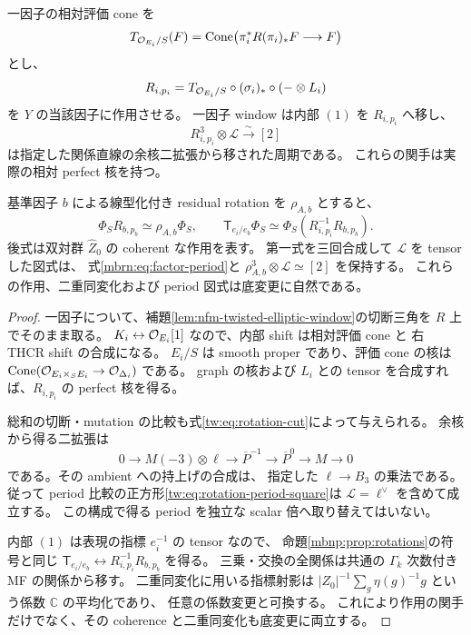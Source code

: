 \begin{proposition}
\label{mbrn:prop:rotations}
一因子の相対評価 cone を
\[
 T_{\mathcal O_{E_i}/S}(F)=
 \operatorname{Cone}\bigl(\pi_i^*R(\pi_i)_*F\longrightarrow F\bigr)
\]
とし、
\[
 R_{i,p_i}=T_{\mathcal O_{E_i}/S}\circ(\sigma_i)_*\circ(-\otimes L_i)
\]
を $Y$ の当該因子に作用させる。
一因子 window は内部 $(1)$ を $R_{i,p_i}$ へ移し、
\begin{equation}\label{mbrn:eq:factor-period}
 R_{i,p_i}^3\otimes\mathscr L\xrightarrow{\sim}[2]
\end{equation}
は指定した関係直線の余核二拡張から移された周期である。
これらの関手は実際の相対 perfect 核を持つ。

基準因子 $b$ による線型化付き residual rotation を $\rho_{A,b}$ とすると、
\begin{equation}\label{mbrn:eq:rotation-comparison}
 \Phi_SR_{b,p_b}\simeq\rho_{A,b}\Phi_S,\qquad
 \mathsf T_{e_i/e_b}\Phi_S\simeq
                    \Phi_S(R_{i,p_i}^{-1}R_{b,p_b}).
\end{equation}
後式は双対群 $\widehat Z_0$ の coherent な作用を表す。
第一式を三回合成して $\mathscr L$ を tensor した図式は、
式\eqref{mbrn:eq:factor-period}と
$\rho_{A,b}^3\otimes\mathscr L\simeq[2]$ を保持する。
これらの作用、二重同変化および period 図式は底変更に自然である。
\end{proposition}
\begin{proof}
一因子について、補題\ref{lem:nfm-twisted-elliptic-window}の切断三角を
$R$ 上でそのまま取る。
$K_i\leftrightarrow\mathcal O_{E_i}[1]$ なので、内部 shift は相対評価 cone と
右 THCR shift の合成になる。
$E_i/S$ は smooth proper であり、評価 cone の核は
$\operatorname{Cone}(\mathcal O_{E_i\times_SE_i}\to\mathcal O_{\Delta_i})$ である。
graph の核および $L_i$ との tensor を合成すれば、$R_{i,p_i}$ の perfect 核を得る。

総和の切断・mutation の比較も式\eqref{tw:eq:rotation-cut}によって与えられる。
余核から得る二拡張は
\[
 0\longrightarrow M(-3)\otimes\ell\longrightarrow
       \overline P^{-1}\longrightarrow\overline P^0
                       \longrightarrow M\longrightarrow0
\]
である。その ambient への持上げの合成は、
指定した $\ell\to B_3$ の乗法である。
従って period 比較の正方形\eqref{tw:eq:rotation-period-square}は
$\mathscr L=\ell^\vee$ を含めて成立する。
この構成で得る period を独立な scalar 倍へ取り替えてはいない。

内部 $(1)$ は表現の指標 $e_i^{-1}$ の tensor なので、
命題\ref{mbnp:prop:rotations}の符号と同じ
$\mathsf T_{e_i/e_b}\leftrightarrow R_{i,p_i}^{-1}R_{b,p_b}$ を得る。
三乗・交換の全関係は共通の $\Gamma_k$ 次数付き MF の関係から移す。
二重同変化に用いる指標射影は
$|Z_0|^{-1}\sum_g\eta(g)^{-1}g$ という係数 $\mathbb C$ の平均化であり、
任意の係数変更と可換する。
これにより作用の関手だけでなく、その coherence と二重同変化も底変更に両立する。
\end{proof}

